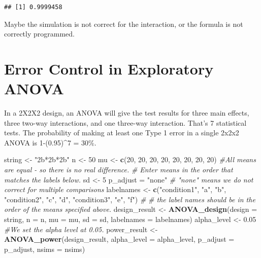 \documentclass[]{book}
\newenvironment{Shaded}{\begin{snugshade}}{\end{snugshade}}
\newcommand{\CommentTok}[1]{\textcolor[rgb]{0.56,0.35,0.01}{\textit{#1}}}
\newcommand{\DataTypeTok}[1]{\textcolor[rgb]{0.13,0.29,0.53}{#1}}
\newcommand{\DecValTok}[1]{\textcolor[rgb]{0.00,0.00,0.81}{#1}}
\newcommand{\FloatTok}[1]{\textcolor[rgb]{0.00,0.00,0.81}{#1}}
\newcommand{\KeywordTok}[1]{\textcolor[rgb]{0.13,0.29,0.53}{\textbf{#1}}}
\newcommand{\NormalTok}[1]{#1}
\newcommand{\StringTok}[1]{\textcolor[rgb]{0.31,0.60,0.02}{#1}}
\begin{document}
\begin{verbatim}
## [1] 0.9999458
\end{verbatim}

Maybe the simulation is not correct for the interaction, or the formula is not correctly programmed.

\hypertarget{error-control-in-exploratory-anova}{%
\chapter{Error Control in Exploratory ANOVA}\label{error-control-in-exploratory-anova}}

In a 2X2X2 design, an ANOVA will give the test results for three main effects, three two-way interactions, and one three-way interaction. That's 7 statistical tests. The probability of making at least one Type 1 error in a single 2x2x2 ANOVA is 1-(0.95)\^{}7 = 30\%.

\begin{Shaded}
\begin{Highlighting}[]
\NormalTok{string <-}\StringTok{ "2b*2b*2b"}
\NormalTok{n <-}\StringTok{ }\DecValTok{50}
\NormalTok{mu <-}\StringTok{ }\KeywordTok{c}\NormalTok{(}\DecValTok{20}\NormalTok{, }\DecValTok{20}\NormalTok{, }\DecValTok{20}\NormalTok{, }\DecValTok{20}\NormalTok{, }\DecValTok{20}\NormalTok{, }\DecValTok{20}\NormalTok{, }\DecValTok{20}\NormalTok{, }\DecValTok{20}\NormalTok{) }\CommentTok{#All means are equal - so there is no real difference.}
\CommentTok{# Enter means in the order that matches the labels below.}
\NormalTok{sd <-}\StringTok{ }\DecValTok{5}
\NormalTok{p_adjust =}\StringTok{ "none"}
\CommentTok{# "none" means we do not correct for multiple comparisons}
\NormalTok{labelnames <-}\StringTok{ }\KeywordTok{c}\NormalTok{(}\StringTok{"condition1"}\NormalTok{, }\StringTok{"a"}\NormalTok{, }\StringTok{"b"}\NormalTok{, }\StringTok{"condition2"}\NormalTok{, }\StringTok{"c"}\NormalTok{, }\StringTok{"d"}\NormalTok{, }\StringTok{"condition3"}\NormalTok{, }\StringTok{"e"}\NormalTok{, }\StringTok{"f"}\NormalTok{) }\CommentTok{#}
\CommentTok{# the label names should be in the order of the means specified above.}
\NormalTok{design_result <-}\StringTok{ }\KeywordTok{ANOVA_design}\NormalTok{(}\DataTypeTok{design =}\NormalTok{ string,}
                   \DataTypeTok{n =}\NormalTok{ n, }
                   \DataTypeTok{mu =}\NormalTok{ mu, }
                   \DataTypeTok{sd =}\NormalTok{ sd, }
                   \DataTypeTok{labelnames =}\NormalTok{ labelnames)}
\NormalTok{alpha_level <-}\StringTok{ }\FloatTok{0.05}
\CommentTok{#We set the alpha level at 0.05. }
\NormalTok{power_result <-}\StringTok{ }\KeywordTok{ANOVA_power}\NormalTok{(design_result, }
                            \DataTypeTok{alpha_level =}\NormalTok{ alpha_level, }
                            \DataTypeTok{p_adjust =}\NormalTok{ p_adjust,}
                            \DataTypeTok{nsims =}\NormalTok{ nsims)}
\end{Highlighting}
\end{Shaded}
\end{document}
